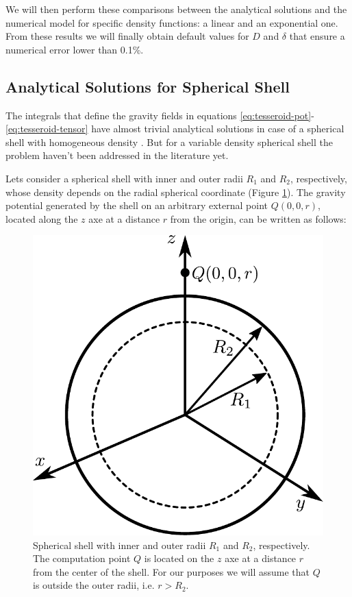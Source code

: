 \documentclass[extra]{gji}
\begin{document}
We will then perform these comparisons between the analytical solutions
and the numerical model for specific density functions: a linear and an
exponential one.
From these results we will finally obtain default values for $D$
and $\delta$ that ensure a numerical error lower than 0.1\%.


\subsection{Analytical Solutions for Spherical Shell}

The integrals that define the gravity fields in equations
\ref{eq:tesseroid-pot}-\ref{eq:tesseroid-tensor} have almost trivial
analytical solutions in case of a spherical shell with homogeneous
density \citep{Mikuska2006,Grombein2013}.
But for a variable density spherical shell the problem haven't been
addressed in the literature yet.

Lets consider a spherical shell with inner and outer radii $R_1$ and
$R_2$, respectively, whose density depends on the radial spherical
coordinate (Figure \ref{fig:spherical-shell}).
The gravity potential generated by the shell on an arbitrary external
point $Q(0,0,r)$, located along the $z$ axe at a distance $r$ from the
origin, can be written as follows:

\begin{figure}
\centering
\includegraphics[width=0.7\linewidth]{figures/spherical-shell.pdf}
\caption{
    Spherical shell with inner and outer radii $R_1$ and $R_2$, respectively.
    The computation point $Q$ is located on the $z$ axe at a distance $r$ from
    the center of the shell.
    For our purposes we will assume that $Q$ is outside the outer radii,
    i.e. $r > R_2$.
    }
\label{fig:spherical-shell}
\end{figure}
\end{document}
